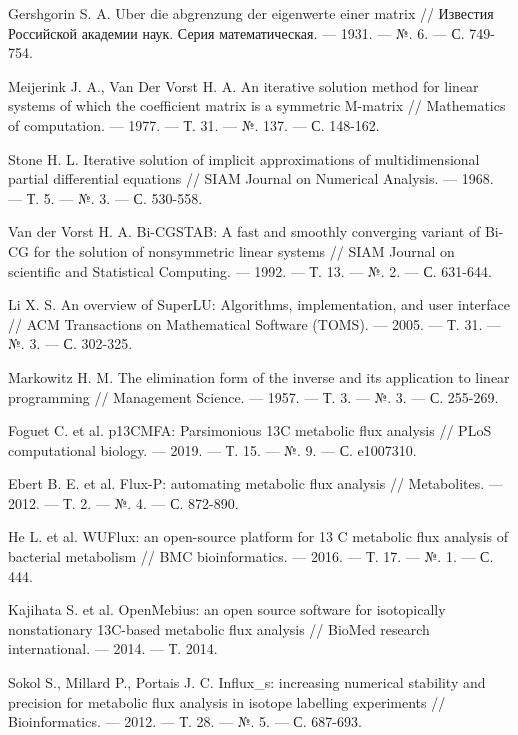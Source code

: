 \documentclass[14pt, a4paper]{extreport}
\begin{document}
\begin{thebibliography}{XXXX}
	Gershgorin S. A. Uber die abgrenzung der eigenwerte einer matrix // Известия Российской академии наук. Серия математическая. --- 1931. --- №. 6. --- С. 749-754.
	
	Meijerink J. A., Van Der Vorst H. A. An iterative solution method for linear systems of which the coefficient matrix is a symmetric M-matrix // Mathematics of computation. --- 1977. --- Т. 31. --- №. 137. --- С. 148-162.
	
	Stone H. L. Iterative solution of implicit approximations of multidimensional partial differential equations // SIAM Journal on Numerical Analysis. --- 1968. --- Т. 5. --- №. 3. --- С. 530-558.
	
	Van der Vorst H. A. Bi-CGSTAB: A fast and smoothly converging variant of Bi-CG for the solution of nonsymmetric linear systems // SIAM Journal on scientific and Statistical Computing. --- 1992. --- Т. 13. --- №. 2. --- С. 631-644.
	
	Li X. S. An overview of SuperLU: Algorithms, implementation, and user interface // ACM Transactions on Mathematical Software (TOMS). --- 2005. --- Т. 31. --- №. 3. --- С. 302-325.
	
	Markowitz H. M. The elimination form of the inverse and its application to linear programming // Management Science. --- 1957. --- Т. 3. --- №. 3. --- С. 255-269.
	
	Foguet C. et al. p13CMFA: Parsimonious 13C metabolic flux analysis // PLoS computational biology. --- 2019. --- Т. 15. --- №. 9. --- С. e1007310.
	
	Ebert B. E. et al. Flux-P: automating metabolic flux analysis // Metabolites. --- 2012. --- Т. 2. --- №. 4. --- С. 872-890.
	
	He L. et al. WUFlux: an open-source platform for 13 C metabolic flux analysis of bacterial metabolism // BMC bioinformatics. --- 2016. --- Т. 17. --- №. 1. --- С. 444.
	
	Kajihata S. et al. OpenMebius: an open source software for isotopically nonstationary 13C-based metabolic flux analysis // BioMed research international. --- 2014. --- Т. 2014.
	
	Sokol S., Millard P., Portais J. C. Influx\_s: increasing numerical stability and precision for metabolic flux analysis in isotope labelling experiments // Bioinformatics. --- 2012. --- Т. 28. --- №. 5. --- С. 687-693.
	
\end{thebibliography}
\end{document}
